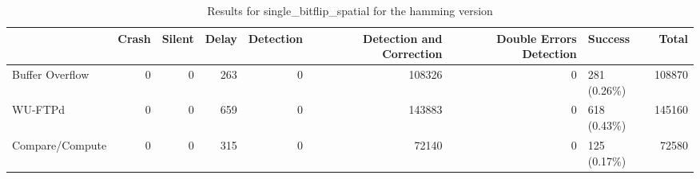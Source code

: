 \begin{table}[t]
	\centering
	\caption{Results for single_bitflip_spatial for the hamming version}
	\label{table:end_sim_by_status_hamming_3_single_bitflip_spatial}
	\begin{tabular}{lrrrrrrlr}
		\toprule
		                & Crash & Silent & Delay & Detection & Detection and Correction & Double Errors Detection & Success      & Total  \\
		\midrule
		Buffer Overflow & 0     & 0      & 263   & 0         & 108326                   & 0                       & 281 (0.26\%) & 108870 \\
		WU-FTPd         & 0     & 0      & 659   & 0         & 143883                   & 0                       & 618 (0.43\%) & 145160 \\
		Compare/Compute & 0     & 0      & 315   & 0         & 72140                    & 0                       & 125 (0.17\%) & 72580  \\
		\bottomrule
	\end{tabular}
\end{table}